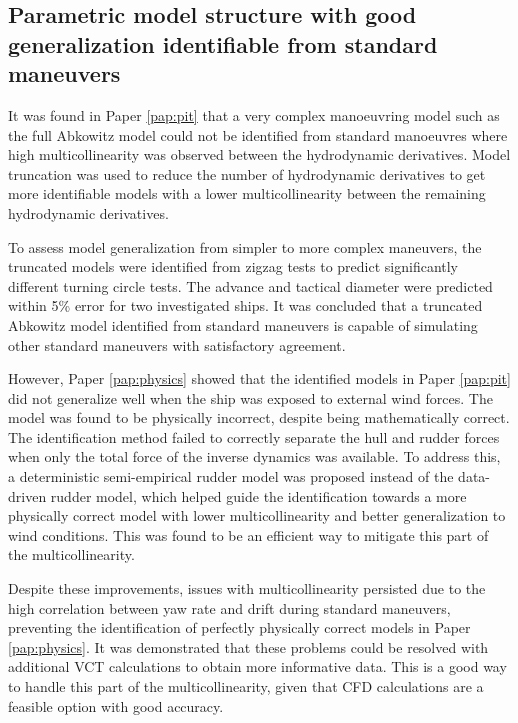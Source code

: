\subsection*{Parametric model structure with good generalization identifiable from standard maneuvers}
It was found in Paper \ref{pap:pit} that a very complex manoeuvring model such as the full Abkowitz model could not be identified from standard manoeuvres where high multicollinearity was observed between the hydrodynamic derivatives.  Model truncation was used to reduce the number of hydrodynamic derivatives to get more identifiable models with a lower multicollinearity between the remaining hydrodynamic derivatives.

To assess model generalization from simpler to more complex maneuvers, the truncated models were identified from zigzag tests to predict significantly different turning circle tests. The advance and tactical diameter were predicted within 5\% error for two investigated ships. It was concluded that a truncated Abkowitz model identified from standard maneuvers is capable of simulating other standard maneuvers with satisfactory agreement.

However, Paper \ref{pap:physics} showed that the identified models in Paper \ref{pap:pit} did not generalize well when the ship was exposed to external wind forces. The model was found to be physically incorrect, despite being mathematically correct. The identification method failed to correctly separate the hull and rudder forces when only the total force of the inverse dynamics was available. To address this, a deterministic semi-empirical rudder model was proposed instead of the data-driven rudder model, which helped guide the identification towards a more physically correct model with lower multicollinearity and better generalization to wind conditions. This was found to be an efficient way to mitigate this part of the multicollinearity.

Despite these improvements, issues with multicollinearity persisted due to the high correlation between yaw rate and drift during standard maneuvers, preventing the identification of perfectly physically correct models in Paper \ref{pap:physics}. It was demonstrated that these problems could be resolved with additional VCT calculations to obtain more informative data. This is a good way to handle this part of the multicollinearity, given that CFD calculations are a feasible option with good accuracy.

